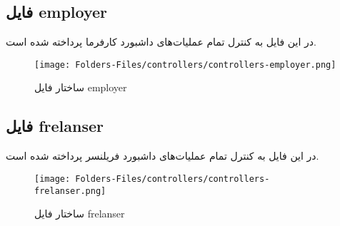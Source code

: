 \subsection{فایل employer}
در این فایل به کنترل تمام عملیات‌های داشبورد کارفرما پرداخته شده است.
\begin{figure}[H]
	\texttt{[image: Folders-Files/controllers/controllers-employer.png]}
	\centering
	\caption{ساختار فایل employer}
	\label{fig:file:controllers:employer}
\end{figure}

\subsection{فایل frelanser}
در این فایل به کنترل تمام عملیات‌های داشبورد فریلنسر پرداخته شده است.
\begin{figure}[H]
	\texttt{[image: Folders-Files/controllers/controllers-frelanser.png]}
	\centering
	\caption{ساختار فایل frelanser}
	\label{fig:file:controllers:frelanser}
\end{figure}
